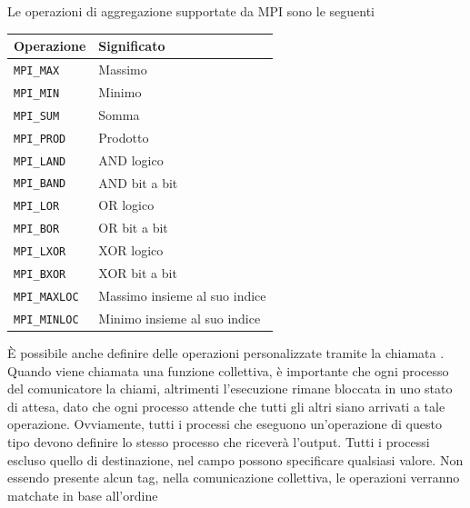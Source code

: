 \documentclass[10pt, letterpaper]{report}
\begin{document}
Le operazioni di aggregazione supportate da MPI sono le seguenti \begin{center}
    \begin{tabular}{|l|l|}
        \hline
        \rowcolor[HTML]{6434FC} 
        {\color[HTML]{FFFFFF} Operazione}     & {\color[HTML]{FFFFFF} Significato} \\ \hline
        \texttt{MPI\_MAX}    & Massimo                            \\ \hline
        \texttt{MPI\_MIN}    & Minimo                             \\ \hline
        \texttt{MPI\_SUM}    & Somma                              \\ \hline
        \texttt{MPI\_PROD}   & Prodotto                           \\ \hline
        \texttt{MPI\_LAND}   & AND logico                         \\ \hline
        \texttt{MPI\_BAND}   & AND bit a bit                      \\ \hline
        \texttt{MPI\_LOR}    & OR logico                          \\ \hline
        \texttt{MPI\_BOR}    & OR bit a bit                       \\ \hline
        \texttt{MPI\_LXOR}   & XOR logico                         \\ \hline
        \texttt{MPI\_BXOR}   & XOR bit a bit                      \\ \hline
        \texttt{MPI\_MAXLOC} & Massimo insieme al suo indice      \\ \hline
        \texttt{MPI\_MINLOC} & Minimo insieme al suo indice       \\ \hline
        \end{tabular}
\end{center}
È possibile anche definire delle operazioni personalizzate tramite la chiamata .\acc 
Quando viene chiamata una funzione collettiva, è importante che ogni processo del comunicatore la chiami, altrimenti 
l'esecuzione rimane bloccata in uno stato di attesa, dato che ogni processo attende che tutti gli altri siano arrivati 
a tale operazione. Ovviamente, tutti i processi che eseguono un'operazione di questo tipo devono definire lo 
stesso processo che riceverà l'output. Tutti i processi escluso quello di destinazione, nel campo 
 possono specificare qualsiasi valore.\acc 
Non essendo presente alcun tag, nella comunicazione collettiva, le operazioni verranno matchate in base all'ordine 
\end{document}
